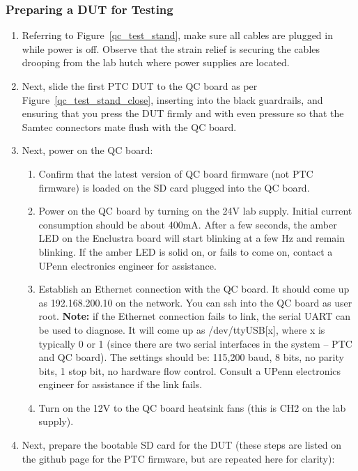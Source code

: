 \documentclass[a4paper,12pt]{article}
\begin{document}
\subsubsection{Preparing a DUT for Testing}
\label{section:dut_setup}

    \begin{enumerate}
        \item Referring to Figure~\ref{qc_test_stand}, make sure all cables are plugged in while power is off. Observe that the strain relief is securing the cables drooping from the lab hutch where power supplies are located. 
    
        \item Next, slide the first PTC DUT to the QC board as per Figure~\ref{qc_test_stand_close}, inserting into the black guardrails, and ensuring that you press the DUT firmly and with even pressure so that the Samtec connectors mate flush with the QC board.
        \item Next, power on the QC board:
            \begin{enumerate}
                \item Confirm that the latest version of QC board firmware (not PTC firmware) is loaded on the SD card plugged into the QC board.
                \item Power on the QC board by turning on the 24V lab supply. Initial current consumption should be about 400mA. After a few seconds, the amber LED on the Enclustra board will start blinking at a few Hz and remain blinking. If the amber LED is solid on, or fails to come on, contact a UPenn electronics engineer for assistance.
                \item Establish an Ethernet connection with the QC board. It should come up as 192.168.200.10 on the network. You can ssh into the QC board as user root. \textbf{Note:} if the Ethernet connection fails to link, the serial UART can be used to diagnose. It will come up as /dev/ttyUSB[x], where x is typically 0 or 1 (since there are two serial interfaces in the system -- PTC and QC board). The settings should be: 115,200 baud, 8 bits, no parity bits, 1 stop bit, no hardware flow control. Consult a UPenn electronics engineer for assistance if the link fails.
                \item Turn on the 12V to the QC board heatsink fans (this is CH2 on the lab supply).
            \end{enumerate}
        \item Next, prepare the bootable SD card for the DUT (these steps are listed on the github page for the PTC firmware, but are repeated here for clarity):

\end{enumerate}
\end{document}

